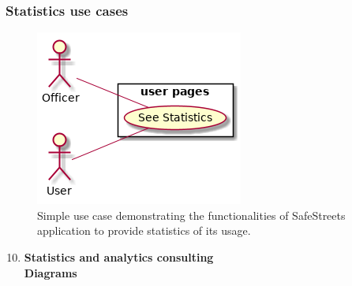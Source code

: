 \subsubsection{Statistics use cases}
\begin{figure}[htp]
	\centering
	\includegraphics[width=\textwidth]{images/useCases/uc_statistics.png}
	\caption{Simple use case demonstrating the functionalities of SafeStreets application to provide statistics of its usage.} 
	\label{fig:statisticsuc} 
\end{figure}

\newpage
\begin{enumerate}
	\setcounter{enumi}{9}
	\item \textbf{Statistics and analytics consulting}\\
	
	\newpage
	\textbf{Diagrams}
	\newpage
\end{enumerate}
\newpage

